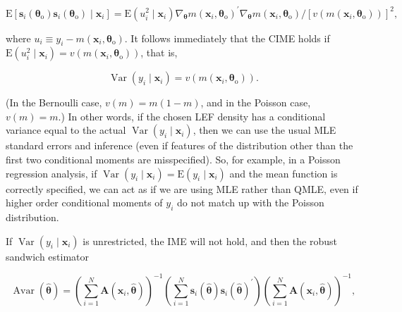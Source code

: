 \documentclass[10pt]{article}
\begin{document}
\begin{equation*}
\mathrm{E}\left[\mathbf{s}_{i}\left(\boldsymbol{\theta}_{\mathrm{o}}\right) \mathbf{s}_{i}\left(\boldsymbol{\theta}_{\mathrm{o}}\right) \mid \mathbf{x}_{i}\right]=\mathrm{E}\left(u_{i}^{2} \mid \mathbf{x}_{i}\right) \nabla_{\boldsymbol{\theta}} m\left(\mathbf{x}_{i}, \boldsymbol{\theta}_{\mathrm{o}}\right)^{\prime} \nabla_{\boldsymbol{\theta}} m\left(\mathbf{x}_{i}, \boldsymbol{\theta}_{\mathrm{o}}\right) /\left[v\left(m\left(\mathbf{x}_{i}, \boldsymbol{\theta}_{\mathrm{o}}\right)\right)\right]^{2}, \tag{13.86}
\end{equation*}


where $u_{i} \equiv y_{i}-m\left(\mathbf{x}_{i}, \boldsymbol{\theta}_{\mathrm{o}}\right)$. It follows immediately that the CIME holds if $\mathrm{E}\left(u_{i}^{2} \mid \mathbf{x}_{i}\right)= v\left(m\left(\mathbf{x}_{i}, \boldsymbol{\theta}_{\mathrm{o}}\right)\right)$, that is,


\begin{equation*}
\operatorname{Var}\left(y_{i} \mid \mathbf{x}_{i}\right)=v\left(m\left(\mathbf{x}_{i}, \boldsymbol{\theta}_{\mathrm{o}}\right)\right) . \tag{13.87}
\end{equation*}


(In the Bernoulli case, $v(m)=m(1-m)$, and in the Poisson case, $v(m)=m$.) In other words, if the chosen LEF density has a conditional variance equal to the actual $\operatorname{Var}\left(y_{i} \mid \mathbf{x}_{i}\right)$, then we can use the usual MLE standard errors and inference (even if features of the distribution other than the first two conditional moments are misspecified). So, for example, in a Poisson regression analysis, if $\operatorname{Var}\left(y_{i} \mid \mathbf{x}_{i}\right)=\mathrm{E}\left(y_{i} \mid \mathbf{x}_{i}\right)$ and the mean function is correctly specified, we can act as if we are using MLE rather than QMLE, even if higher order conditional moments of $y_{i}$ do not match up with the Poisson distribution.

If $\operatorname{Var}\left(y_{i} \mid \mathbf{x}_{i}\right)$ is unrestricted, the IME will not hold, and then the robust sandwich estimator


\begin{equation*}
\widehat{\operatorname{Avar}(\hat{\boldsymbol{\theta}})}=\left(\sum_{i=1}^{N} \mathbf{A}\left(\mathbf{x}_{i}, \hat{\boldsymbol{\theta}}\right)\right)^{-1}\left(\sum_{i=1}^{N} \mathbf{s}_{i}(\hat{\boldsymbol{\theta}}) \mathbf{s}_{i}(\hat{\boldsymbol{\theta}})^{\prime}\right)\left(\sum_{i=1}^{N} \mathbf{A}\left(\mathbf{x}_{i}, \hat{\boldsymbol{\theta}}\right)\right)^{-1}, \tag{13.88}
\end{equation*}
\end{document}
